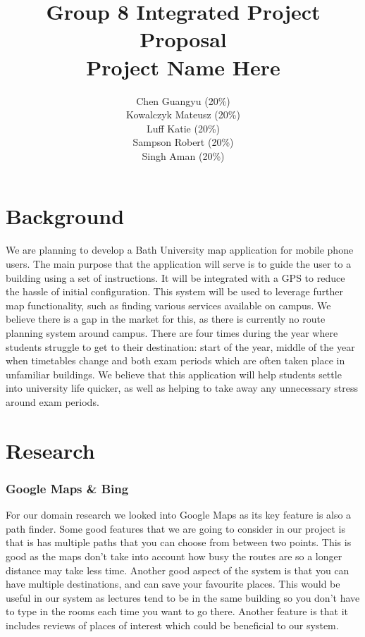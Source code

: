 \documentclass[10pt,a4paper,oneside]{report}
\begin{document}
\title{Group 8 Integrated Project Proposal\\Project Name Here}

\author{
  Chen Guangyu (20\%)\\
  Kowalczyk Mateusz (20\%)\\
  Luff Katie (20\%)\\
  Sampson Robert (20\%)\\
  Singh Aman (20\%)\\ }
\maketitle
\section*{Background}
We are planning to develop a Bath University map application for mobile phone users. The main purpose that the application will serve is to guide the user to a building using a set of instructions. It will be integrated with a GPS to reduce the hassle of initial configuration. This system will be used to leverage further map functionality, such as finding various services available on campus.
We believe there is a gap in the market for this, as there is currently no route planning system around campus. There are four times during the year where students struggle to get to their destination: start of the year, middle of the year when timetables change and both exam periods which are often taken place in unfamiliar buildings. We believe that this application will help students settle into university life quicker, as well as helping to take away any unnecessary stress around exam periods.

\section*{Research}
\subsubsection*{Google Maps \& Bing}
For our domain research we looked into Google Maps as its key feature is also a path finder. Some good features that we are going to consider in our project is that is has multiple paths that you can choose from between two points. This is good as the maps don't take into account how busy the routes are so a longer distance may take less time. Another good aspect of the system is that you can have multiple destinations, and can save your favourite places. This would be useful in our system as lectures tend to be in the same building so you don't have to type in the rooms each time you want to go there. Another feature is that it includes reviews of places of interest which could be beneficial to our system.
\end{document}
